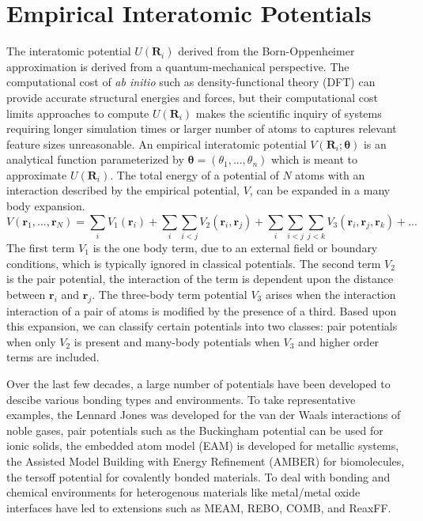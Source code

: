 \section{Empirical Interatomic Potentials}
The interatomic potential $U(\bm{R}_i)$ derived from the Born-Oppenheimer approximation is derived from a quantum-mechanical perspective.
The computational cost of \emph{ab initio} such as density-functional theory (DFT) can provide accurate structural energies and forces, but their computational cost limits approaches to compute $U(\bm{R}_i)$ makes the scientific inquiry of systems requiring longer simulation times or larger number of atoms to captures relevant feature sizes unreasonable.
An empirical interatomic potential $V(\bm{R}_i;\bm{\theta})$ is an analytical function parameterized by $\bm{\theta}=(\theta_1,...,\theta_n)$ which is meant to approximate $U(\bm{R}_i)$.  The total energy of a potential of $N$ atoms with an interaction described by the empirical potential, $V$, can be expanded in a many body expansion.
\begin{equation}
	V(\bm{r}_1,...,\bm{r}_N)= \sum_i V_1(\bm{r}_i)
	                          + \sum_i \sum_{i<j} V_2(\bm{r}_i,\bm{r}_j)
				  + \sum_i \sum_{i<j} \sum_{j<k} V_3(\bm{r}_i,\bm{r}_j,\bm{r}_k) + ...
\end{equation}
The first term $V_1$ is the one body term, due to an external field or boundary conditions, which is typically ignored in classical potentials.  The second term $V_2$ is the pair potential, the interaction of the term is dependent upon the distance between $\bm{r}_i$ and $\bm{r}_j$.  The three-body term potential $V_3$ arises when the interaction interaction of a pair of atoms is modified by the presence of a third.  Based upon this expansion, we can classify certain potentials into two classes: pair potentials when only $V_2$ is present and many-body potentials when $V_3$ and higher order terms are included.

Over the last few decades, a large number of potentials have been developed to descibe various bonding types and environments.  To take representative examples, the Lennard Jones was developed for the van der Waals interactions of noble gases, pair potentials such as the Buckingham potential can be used for ionic solids, the embedded atom model (EAM) is developed for metallic systems, the Assisted Model Building with Energy Refinement (AMBER) for biomolecules, the tersoff potential for covalently bonded materials.  To deal with bonding and chemical environments for heterogenous materials like metal/metal oxide interfaces have led to extensions such as MEAM, REBO, COMB, and ReaxFF.


